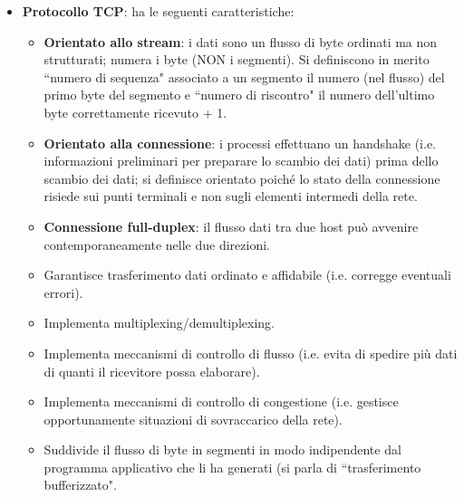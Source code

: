 \documentclass[11pt, italian, openany]{book}
\begin{document}
\begin{sloppypar}
\begin{itemize}[topsep=0pt]
	\item \textbf{Protocollo TCP}: ha le seguenti caratteristiche:
	\vspace{-3.5mm}
	\begin{itemize}
		\itemsep-0.3em
		\item \textbf{Orientato allo stream}: i dati sono un flusso di byte ordinati ma non strutturati; numera i byte (NON i segmenti). Si
		definiscono in merito ``numero di sequenza" associato a un segmento il numero (nel flusso) del primo byte del segmento e ``numero di
		riscontro" il numero dell'ultimo byte correttamente ricevuto + 1.
		\item \textbf{Orientato alla connessione}: i processi effettuano un handshake (i.e. informazioni preliminari per preparare lo scambio
		dei dati) prima dello scambio dei dati; si definisce orientato poich\'e lo stato della connessione risiede sui punti terminali e non
		sugli elementi intermedi della rete.
		\item \textbf{Connessione full-duplex}: il flusso dati tra due host pu\`o avvenire contemporaneamente nelle due direzioni.
		\item Garantisce trasferimento dati ordinato e affidabile (i.e. corregge eventuali errori).
		\item Implementa multiplexing/demultiplexing.
		\item Implementa meccanismi di controllo di flusso (i.e. evita di spedire pi\`u dati di quanti il ricevitore possa elaborare).
		\item Implementa meccanismi di controllo di congestione (i.e. gestisce opportunamente situazioni di sovraccarico della rete).
		\item Suddivide il flusso di byte in segmenti in modo indipendente dal programma applicativo che li ha generati (si parla di ``trasferimento
		bufferizzato".
	\end{itemize}
\pagebreak


\end{itemize}
\end{sloppypar}
\end{document}
